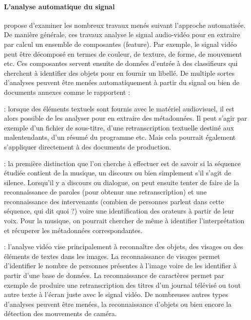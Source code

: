 \paragraph{L'analyse automatique du signal}
\cite{Staab2008} propose d'examiner les nombreux travaux menés suivant l'approche automatisée. 
De manière générale, ces travaux analyse le signal audio-vidéo pour en extraire par calcul un ensemble de composantes (feature).
Par exemple, le signal vidéo peut être décomposé en termes de couleur, de texture, de forme, de mouvement etc. 
Ces composantes servent ensuite de données d'entrée à des classifieurs qui cherchent à identifier des objets pour en fournir un libellé. 
De multiple sortes d'analyses peuvent être menées automatiquement à partir du signal ou bien de documents annexes comme le rapportent \cite[\S 8 : Cataloguing and indexing]{Austerberry2004} : 
\begin{liste}
	\item {} : lorsque des éléments textuels sont fournis avec le matériel audiovisuel, il est alors possible de les analyser pour en extraire des métadonnées. 
	Il peut s'agir par exemple d'un fichier de sous-titre, d'une retranscription textuelle destiné aux malentendants, d'un résumé du programme etc. 
	Mais cela pourrait également s'appliquer directement à des documents de production.

	\item {} : la première distinction que l'on cherche à effectuer est de savoir si la séquence étudiée contient de la musique, un discours ou bien simplement s'il s'agit de silence.
	Lorsqu'il y a discours ou dialogue, on peut ensuite tenter de faire de la reconnaissance de paroles (pour obtenur une retranscription) et une reconnaissance des intervenants (combien de personnes parlent dans cette séquence, qui dit quoi ?) voire une identification des orateurs à partir de leur voix. 
	Pour la musique, on pourrait chercher de même à identifier l'interprétation et récuperer les métadonnées correspondantes. 

	\item {} : l'analyse vidéo vise principalement à reconnaître des objets, des visages ou des éléments de textes dans les images. 
	La reconnaissance de visages permet d'identifier le nombre de personnes présentes à l'image voire de les identifier à partir d'une base de données. 
	La reconnaissance de caractères permet par exemple de produire une retranscription des titres d'un journal télévisé ou tout autre texte à l'écran juste avec le signal vidéo. 
	De nombreuses autres types d'analyses peuvent être menées, la reconnaissance d'objets ou bien encore la détection des mouvements de caméra. 
\end{liste}


